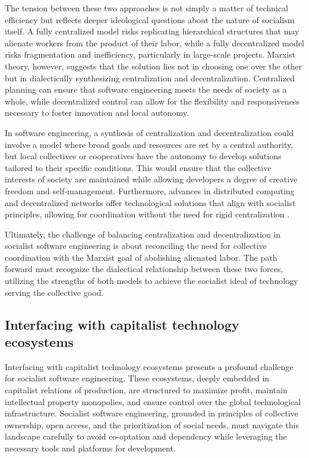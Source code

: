 \begin{refsection}
The tension between these two approaches is not simply a matter of technical efficiency but reflects deeper ideological questions about the nature of socialism itself. A fully centralized model risks replicating hierarchical structures that may alienate workers from the product of their labor, while a fully decentralized model risks fragmentation and inefficiency, particularly in large-scale projects. Marxist theory, however, suggests that the solution lies not in choosing one over the other but in dialectically synthesizing centralization and decentralization. Centralized planning can ensure that software engineering meets the needs of society as a whole, while decentralized control can allow for the flexibility and responsiveness necessary to foster innovation and local autonomy.

In software engineering, a synthesis of centralization and decentralization could involve a model where broad goals and resources are set by a central authority, but local collectives or cooperatives have the autonomy to develop solutions tailored to their specific conditions. This would ensure that the collective interests of society are maintained while allowing developers a degree of creative freedom and self-management. Furthermore, advances in distributed computing and decentralized networks offer technological solutions that align with socialist principles, allowing for coordination without the need for rigid centralization \cite[pp.~9-12]{mueller}.

Ultimately, the challenge of balancing centralization and decentralization in socialist software engineering is about reconciling the need for collective coordination with the Marxist goal of abolishing alienated labor. The path forward must recognize the dialectical relationship between these two forces, utilizing the strengths of both models to achieve the socialist ideal of technology serving the collective good.

\subsection{Interfacing with capitalist technology ecosystems}

Interfacing with capitalist technology ecosystems presents a profound challenge for socialist software engineering. These ecosystems, deeply embedded in capitalist relations of production, are structured to maximize profit, maintain intellectual property monopolies, and ensure control over the global technological infrastructure. Socialist software engineering, grounded in principles of collective ownership, open access, and the prioritization of social needs, must navigate this landscape carefully to avoid co-optation and dependency while leveraging the necessary tools and platforms for development.


\end{refsection}
